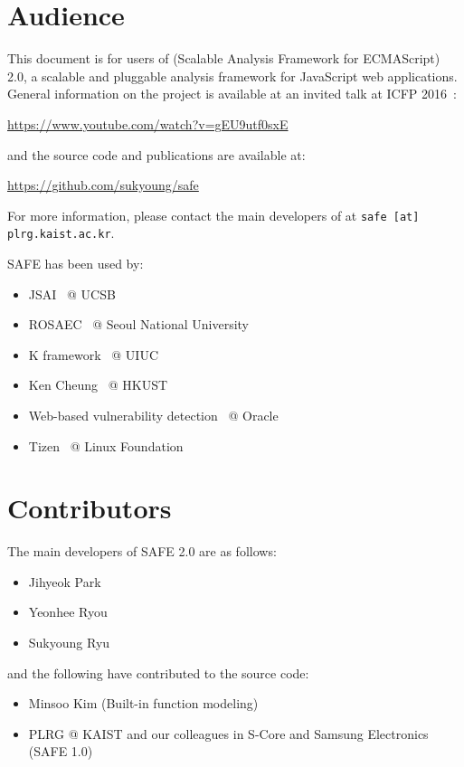 \section{Audience}
This document is for users of \safe (Scalable Analysis Framework for ECMAScript)
2.0, a scalable and pluggable analysis framework for JavaScript web applications.
General information on the \safe project is available at an invited talk at ICFP 2016~\cite{safeicfp16}:
\begin{center}
  \url{https://www.youtube.com/watch?v=gEU9utf0sxE}
\end{center}
and the source code and publications are available at:
\begin{center}
  \url{https://github.com/sukyoung/safe}
\end{center}
For more information, please contact the main developers of \safe
at \texttt{safe [at] plrg.kaist.ac.kr}.

SAFE has been used by:
\begin{itemize}
\itemsep-.2em
\item JSAI~\cite{jsai} @ UCSB
\item ROSAEC~\cite{rosaec} @ Seoul National University
\item K framework~\cite{kjs} @ UIUC
\item Ken Cheung~\cite{emse16} @ HKUST
\item Web-based vulnerability detection~\cite{oracle} @ Oracle
\item Tizen~\cite{tizen} @ Linux Foundation
\end{itemize}

\section{Contributors}
The main developers of SAFE 2.0 are as follows:
\begin{itemize}
\itemsep-.2em
\item Jihyeok Park
\item Yeonhee Ryou
\item Sukyoung Ryu
\end{itemize}
and the following have contributed to the source code:
\begin{itemize}
\itemsep-.1em
\item Minsoo Kim (Built-in function modeling)
\item PLRG @ KAIST and our colleagues in S-Core and Samsung Electronics (SAFE 1.0)
\end{itemize}


